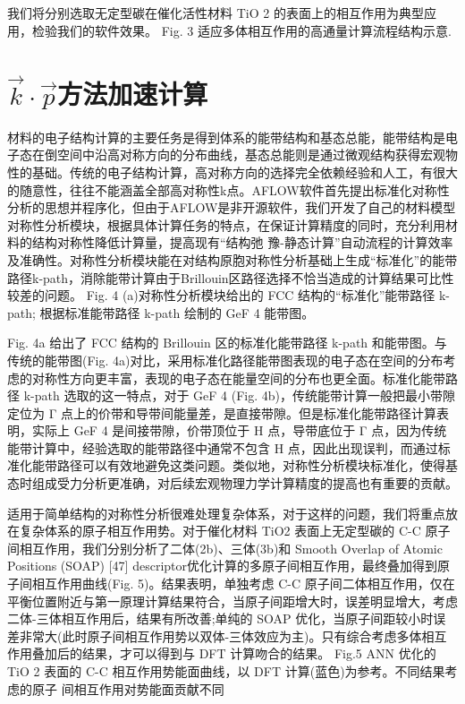 我们将分别选取无定型碳在催化活性材料 TiO 2 的表面上的相互作用为典型应用，检验我们的软件效果。
Fig. 3 适应多体相互作用的高通量计算流程结构示意.

\section{$\vec k\cdot\vec p$方法加速计算}
材料的电子结构计算的主要任务是得到体系的能带结构和基态总能，能带结构是电子态在倒空间中沿高对称方向的分布曲线，基态总能则是通过微观结构获得宏观物性的基础。传统的电子结构计算，高对称方向的选择完全依赖经验和人工，有很大的随意性，往往不能涵盖全部高对称性k点。AFLOW软件首先提出标准化对称性分析的思想并程序化，但由于AFLOW是非开源软件，我们开发了自己的材料模型对称性分析模块，根据具体计算任务的特点，在保证计算精度的同时，充分利用材料的结构对称性降低计算量，提高现有“结构弛 豫-静态计算”自动流程的计算效率及准确性。对称性分析模块能在对结构原胞对称性分析基础上生成“标准化”的能带路径k-path，消除能带计算由于Brillouin区路径选择不恰当造成的计算结果可比性较差的问题。
Fig. 4 (a)对称性分析模块给出的 FCC 结构的“标准化”能带路径 k-path;
根据标准能带路径 k-path 绘制的 GeF 4
能带图。

Fig. 4a 给出了 FCC 结构的 Brillouin 区的标准化能带路径 k-path 和能带图。与传统的能带图(Fig. 4a)对比，采用标准化路径能带图表现的电子态在空间的分布考虑的对称性方向更丰富，表现的电子态在能量空间的分布也更全面。标准化能带路径 k-path 选取的这一特点，对于 GeF 4 (Fig. 4b)，传统能带计算一般把最小带隙定位为 Γ 点上的价带和导带间能量差，是直接带隙。但是标准化能带路径计算表明，实际上 GeF 4 是间接带隙，价带顶位于 H 点，导带底位于 Γ 点，因为传统能带计算中，经验选取的能带路径中通常不包含 H 点，因此出现误判，而通过标准化能带路径可以有效地避免这类问题。类似地，对称性分析模块标准化，使得基态时组成受力分析更准确，对后续宏观物理力学计算精度的提高也有重要的贡献。

适用于简单结构的对称性分析很难处理复杂体系，对于这样的问题，我们将重点放在复杂体系的原子相互作用势。对于催化材料 TiO2 表面上无定型碳的 C-C 原子间相互作用，我们分别分析了二体(2b)、三体(3b)和 Smooth Overlap of Atomic Positions (SOAP) [47] descriptor优化计算的多原子间相互作用，最终叠加得到原子间相互作用曲线(Fig. 5)。结果表明，单独考虑 C-C 原子间二体相互作用，仅在平衡位置附近与第一原理计算结果符合，当原子间距增大时，误差明显增大，考虑二体-三体相互作用后，结果有所改善;单纯的 SOAP 优化，当原子间距较小时误差非常大(此时原子间相互作用势以双体-三体效应为主)。只有综合考虑多体相互作用叠加后的结果，才可以得到与 DFT 计算吻合的结果。
Fig.5 ANN 优化的 TiO 2 表面的 C-C 相互作用势能面曲线，以 DFT 计算(蓝色)为参考。不同结果考虑的原子 间相互作用对势能面贡献不同

